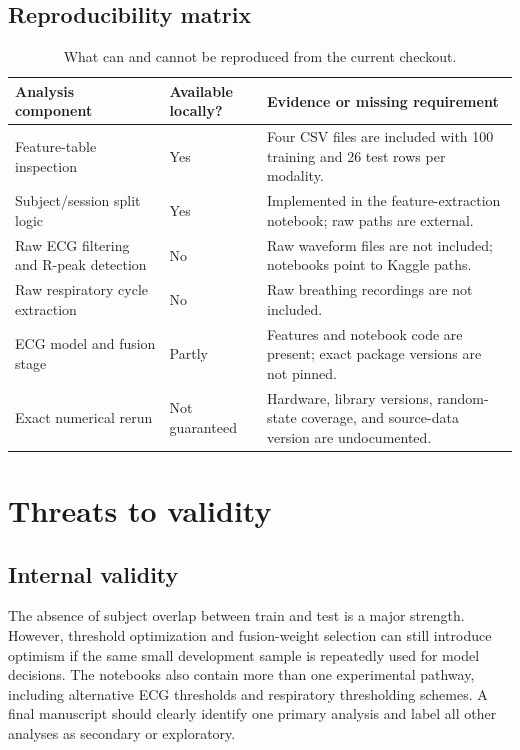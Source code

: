 \documentclass[11pt,a4paper]{article}
\begin{document}
\subsection{Reproducibility matrix}
\begin{table}[H]
\centering
\caption{What can and cannot be reproduced from the current checkout.}
\label{tab:repro}
\begin{tabular}{p{}p{}p{}}
\toprule
\textbf{Analysis component} & \textbf{Available locally?} & \textbf{Evidence or missing requirement}\\
\midrule
Feature-table inspection & Yes & Four CSV files are included with 100 training and 26 test rows per modality.\\
Subject/session split logic & Yes & Implemented in the feature-extraction notebook; raw paths are external.\\
Raw ECG filtering and R-peak detection & No & Raw waveform files are not included; notebooks point to Kaggle paths.\\
Raw respiratory cycle extraction & No & Raw breathing recordings are not included.\\
ECG model and fusion stage & Partly & Features and notebook code are present; exact package versions are not pinned.\\
Exact numerical rerun & Not guaranteed & Hardware, library versions, random-state coverage, and source-data version are undocumented.\\
\bottomrule
\end{tabular}
\end{table}

\section{Threats to validity}
\subsection{Internal validity}
The absence of subject overlap between train and test is a major strength. However, threshold optimization and fusion-weight selection can still introduce optimism if the same small development sample is repeatedly used for model decisions. The notebooks also contain more than one experimental pathway, including alternative ECG thresholds and respiratory thresholding schemes. A final manuscript should clearly identify one primary analysis and label all other analyses as secondary or exploratory.
\end{document}
